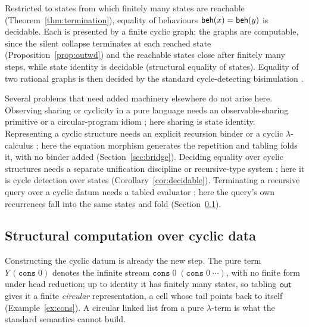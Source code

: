 \begin{corollary}\label{cor:decidable}
  Restricted to states from which finitely many states are reachable (Theorem~\ref{thm:termination}),
  equality of behaviours $\mathsf{beh}(x) = \mathsf{beh}(y)$ is decidable. Each is presented by a finite cyclic
  graph; the graphs are computable, since the silent collapse terminates at each reached state
  (Proposition~\ref{prop:outwd}) and the reachable states close after finitely many steps, while state
  identity is decidable (structural equality of states). Equality of two rational graphs is then decided
  by the standard cycle-detecting bisimulation .
\end{corollary}

\begin{corollary}\label{cor:dissolved}
  Several problems that need added machinery elsewhere do not arise here. Observing sharing or cyclicity
  in a pure language needs an observable-sharing primitive or a circular-program idiom
  ; here sharing is state identity. Representing a cyclic structure needs an
  explicit recursion binder or a cyclic $\lambda$-calculus ; here the equation
  morphism generates the repetition and tabling folds it, with no binder added
  (Section~\ref{sec:bridge}). Deciding equality over cyclic structures needs a separate unification
  discipline or recursive-type system ; here it
  is cycle detection over states (Corollary~\ref{cor:decidable}). Terminating a recursive query over a
  cyclic datum needs a tabled evaluator ; here the query's own
  recurrences fall into the same states and fold (Section~\ref{sec:reach}).
\end{corollary}

\subsection{Structural computation over cyclic data}\label{sec:reach}
Constructing the cyclic datum is already the new step. The pure term $Y\,(\mathtt{cons}\;0)$ denotes
the infinite stream $\mathtt{cons}\;0\;(\mathtt{cons}\;0\;\cdots)$, with no finite form under head
reduction; up to identity it has finitely many states, so tabling $\mathsf{out}$ gives it a finite
\emph{circular} representation, a cell whose tail points back to itself (Example~\ref{ex:cons}). A
circular linked list from a pure $\lambda$-term is what the standard semantics cannot build.

